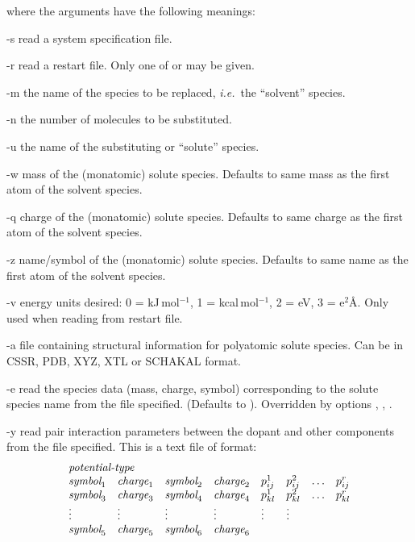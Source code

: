 \documentclass[a4paper,twoside]{report}
\newcommand{\ie}{\emph{i.e.}}
\begin{document}
where the arguments have the following meanings:
\begin{Argdescription}
\item[-s] read a system specification file.
\item[-r] read a restart file. Only one of  or  may be given.
\item[-m] the name of the species to be replaced, \ie\ the ``solvent''
  species.
\item[-n] the number of molecules to be substituted.
\item[-u] the name of the substituting or ``solute'' species.
\item[-w] mass of the (monatomic) solute species. Defaults to same mass as the
  first atom of the solvent species.
\item[-q] charge of the (monatomic) solute species. Defaults to same charge as the
  first atom of the solvent species.
\item[-z] name/symbol of the (monatomic) solute species. Defaults to same name as the
  first atom of the solvent species.
\item[-v] energy units desired: 0 = kJ\,mol$^{-1}$, 1 = kcal\,mol$^{-1}$, 2 = eV, 3 = e$^2${\AA}. Only used when reading from restart file.
\item[-a] file containing structural information for polyatomic solute species. Can be in CSSR, PDB, XYZ, XTL 
  or SCHAKAL format.
\item[-e] read the species data (mass, charge, symbol) corresponding to the
solute species name from the file specified.
(Defaults to ). Overridden  by options , , .
\item[-y] read pair interaction parameters between the dopant and other components
from the file specified. This is a text file of format:
\begin{displaymath}
\begin{array}{llllllll}
\multicolumn{4}{l}{\textit{potential-type}} \\
\textit{symbol}_1 & \textit{charge}_1 & \textit{symbol}_2 & \textit{charge}_2
 & p^{1}_{ij} & p^{2}_{ij} & \ldots & p^{r}_{ij}  \\
\textit{symbol}_3 & \textit{charge}_3 & \textit{symbol}_4 & \textit{charge}_4
 & p^{1}_{kl} & p^{2}_{kl} & \ldots & p^{r}_{kl}  \\
\vdots & \vdots & \vdots & \vdots & \vdots & \vdots \\
\textit{symbol}_5 & \textit{charge}_5 & \textit{symbol}_6 & \textit{charge}_6

\end{array}
\end{displaymath}
\end{Argdescription}
\end{document}
